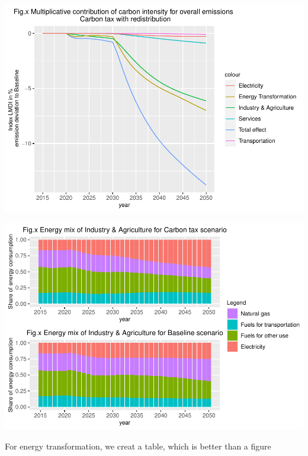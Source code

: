 \documentclass[
]{article}
\begin{document}
\includegraphics{Modele-ThreeMe-Tunisie_Sequeira_Valilou_Wang_files/figure-latex/unnamed-chunk-21-1.pdf}

\includegraphics{Modele-ThreeMe-Tunisie_Sequeira_Valilou_Wang_files/figure-latex/unnamed-chunk-22-1.pdf}

For energy transformation, we creat a table, which is better than a
figure
\end{document}
